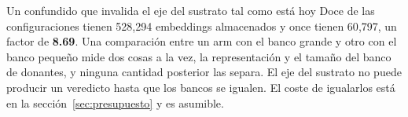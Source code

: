 \begin{aviso}{Un confundido que invalida el eje del sustrato tal como está hoy}
Doce de las configuraciones tienen 528{,}294 embeddings almacenados y once tienen
60{,}797, un factor de \textbf{8.69}. Una comparación entre un arm con el banco
grande y otro con el banco pequeño mide dos cosas a la vez, la representación y el
tamaño del banco de donantes, y ninguna cantidad posterior las separa. El eje del
sustrato no puede producir un veredicto hasta que los bancos se igualen. El coste
de igualarlos está en la sección~\ref{sec:presupuesto} y es asumible.
\end{aviso}
